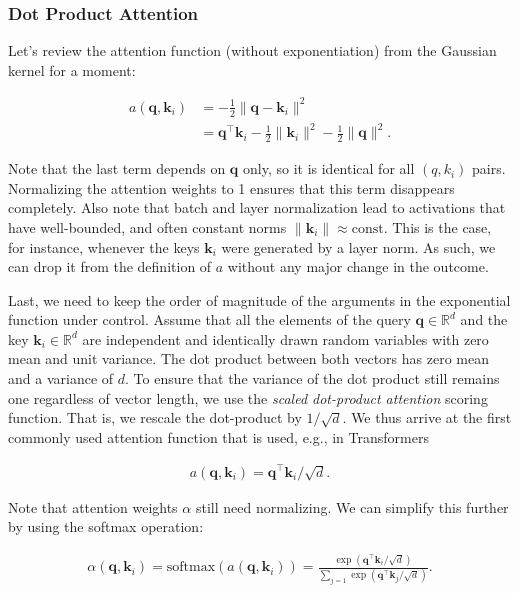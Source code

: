 \documentclass[a4paper,12pt]{article}
\theoremstyle{definition}
\begin{document}
\subsubsection*{Dot Product Attention}
Let's review the attention function (without exponentiation) from the Gaussian kernel for a moment:

\begin{align*}
    a(\mathbf{q}, \mathbf{k}_i) & = -\frac{1}{2} \|\mathbf{q} - \mathbf{k}_i\|^2                                                 \\
                                & = \mathbf{q}^\top \mathbf{k}_i -\frac{1}{2} \|\mathbf{k}_i\|^2  -\frac{1}{2} \|\mathbf{q}\|^2.
\end{align*}

Note that the last term depends on $\mathbf{q}$ only, so it is identical for all $(q,k_i)$ pairs. Normalizing the attention weights to 1 ensures that this term disappears completely.
Also note that batch and layer normalization lead to activations that have well-bounded, and often constant norms $\|\mathbf{k}_i\| \approx \mathrm{const}$. This is the case,
for instance, whenever the keys $\mathbf{k}_i$ were generated by a layer norm. As such, we can drop it from the definition of $a$ without any major change in the outcome.

Last, we need to keep the order of magnitude of the arguments in the exponential function under control. Assume that all the elements of the query $\mathbf{q} \in \mathbb{R}^d$
and the key $\mathbf{k}_i \in \mathbb{R}^d$ are independent and identically drawn random variables with zero mean and unit variance. The dot product between both vectors has
zero mean and a variance of $d$. To ensure that the variance of the dot product still remains one regardless of vector length, we use the \emph{scaled dot-product attention} scoring function.
That is, we rescale the dot-product by $1/\sqrt{d}$. We thus arrive at the first commonly used attention function that is used, e.g., in Transformers

\begin{align*}
    a(\mathbf{q}, \mathbf{k}_i) = \mathbf{q}^\top \mathbf{k}_i / \sqrt{d}.
\end{align*}

Note that attention weights $\alpha$ still need normalizing. We can simplify this further by using the softmax operation:

\begin{align*}
    \alpha(\mathbf{q}, \mathbf{k}_i) = \mathrm{softmax}(a(\mathbf{q}, \mathbf{k}_i)) = \frac{\exp(\mathbf{q}^\top \mathbf{k}_i / \sqrt{d})}{\sum_{j=1} \exp(\mathbf{q}^\top \mathbf{k}_j / \sqrt{d})}.
\end{align*}
\end{document}
